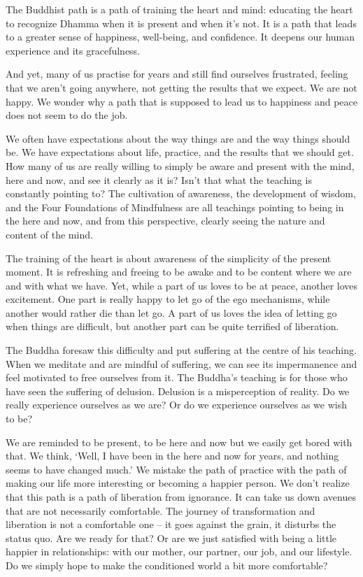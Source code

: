 

The Buddhist path is a path of training the heart and mind: educating the heart to recognize Dhamma when it is present and when it's not. It is a path that leads to a greater sense of happiness, well-being, and confidence. It deepens our human experience and its gracefulness. 

And yet, many of us practise for years and still find ourselves frustrated, feeling that we aren't going anywhere, not getting the results that we expect. We are not happy. We wonder why a path that is supposed to lead us to happiness and peace does not seem to do the job. 

We often have expectations about the way things are and the way things should be. We have expectations about life, practice, and the results that we should get. How many of us are really willing to simply be aware and present with the mind, here and now, and see it clearly as it is? Isn't that what the teaching is constantly pointing to? The cultivation of awareness, the development of wisdom, and the Four Foundations of Mindfulness are all teachings pointing to being in the here and now, and from this perspective, clearly seeing the nature and content of the mind. 

The training of the heart is about awareness of the simplicity of the present moment. It is refreshing and freeing to be awake and to be content where we are and with what we have. Yet, while a part of us loves to be at peace, another loves excitement. One part is really happy to let go of the ego mechanisms, while another would rather die than let go. A part of us loves the idea of letting go when things are difficult, but another part can be quite terrified of liberation.

The Buddha foresaw this difficulty and put suffering at the centre of his teaching. When we meditate and are mindful of suffering, we can see its impermanence and feel motivated to free ourselves from it. The Buddha's teaching is for those who have seen the suffering of delusion. Delusion is a misperception of reality. Do we really experience ourselves as we are? Or do we experience ourselves as we wish to be?

We are reminded to be present, to be here and now but we easily get bored with that. We think, `Well, I have been in the here and now for years, and nothing seems to have changed much.' We mistake the path of practice with the path of making our life more interesting or becoming a happier person. We don't realize that this path is a path of liberation from ignorance. It can take us down avenues that are not necessarily comfortable. The journey of transformation and liberation is not a comfortable one -- it goes against the grain, it disturbs the status quo. Are we ready for that? Or are we just satisfied with being a little happier in relationships: with our mother, our partner, our job, and our lifestyle. Do we simply hope to make the conditioned world a bit more comfortable? 

